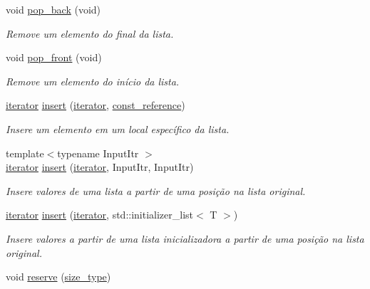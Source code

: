 \begin{DoxyCompactItemize}
void \hyperlink{classsc_1_1vector_a14f1f81fdf7c217436a711fc146dd468}{pop\+\_\+back} (void)
\begin{DoxyCompactList}\small\item\em Remove um elemento do final da lista. \end{DoxyCompactList}\item 
void \hyperlink{classsc_1_1vector_a70a3d59cfa4558d7efbb42f8a8e772d7}{pop\+\_\+front} (void)
\begin{DoxyCompactList}\small\item\em Remove um elemento do início da lista. \end{DoxyCompactList}\item 
\hyperlink{classsc_1_1vector_a9e5d5cc35e379aa27a93989f4a71413c}{iterator} \hyperlink{classsc_1_1vector_a01e7462fc5e35d8e1081dfe3bf6b62ea}{insert} (\hyperlink{classsc_1_1vector_a9e5d5cc35e379aa27a93989f4a71413c}{iterator}, \hyperlink{classsc_1_1vector_a8da2b1a11b069241100f9b2e14f481a0}{const\+\_\+reference})
\begin{DoxyCompactList}\small\item\em Insere um elemento em um local específico da lista. \end{DoxyCompactList}\item 
{\footnotesize template$<$typename Input\+Itr $>$ }\\\hyperlink{classsc_1_1vector_a9e5d5cc35e379aa27a93989f4a71413c}{iterator} \hyperlink{classsc_1_1vector_acf2e500da5525a7a0069e2947df98d43}{insert} (\hyperlink{classsc_1_1vector_a9e5d5cc35e379aa27a93989f4a71413c}{iterator}, Input\+Itr, Input\+Itr)
\begin{DoxyCompactList}\small\item\em Insere valores de uma lista a partir de uma posição na lista original. \end{DoxyCompactList}\item 
\hyperlink{classsc_1_1vector_a9e5d5cc35e379aa27a93989f4a71413c}{iterator} \hyperlink{classsc_1_1vector_a038b7769a69eea810e6913fb910236d6}{insert} (\hyperlink{classsc_1_1vector_a9e5d5cc35e379aa27a93989f4a71413c}{iterator}, std\+::initializer\+\_\+list$<$ T $>$)
\begin{DoxyCompactList}\small\item\em Insere valores a partir de uma lista inicializadora a partir de uma posição na lista original. \end{DoxyCompactList}\item 
void \hyperlink{classsc_1_1vector_a58951f9d3202027e0de28e8f9e0eb542}{reserve} (\hyperlink{classsc_1_1vector_a48bf37ba1a6d0c13504414d86e27c399}{size\+\_\+type})

\end{DoxyCompactItemize}
